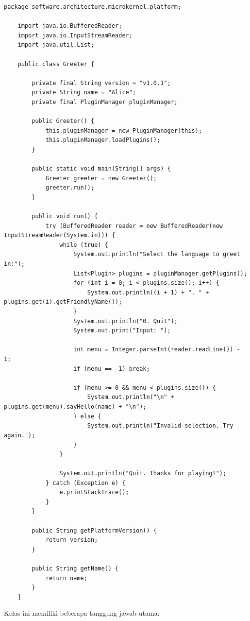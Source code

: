 \begin{lstlisting}[style=JavaStyle, caption={Kelas \texttt{Greeter}}, label={lst:greeter}, inputencoding=utf8]
	package software.architecture.microkernel.platform;
	
	import java.io.BufferedReader;
	import java.io.InputStreamReader;
	import java.util.List;
	
	public class Greeter {
		
		private final String version = "v1.0.1";
		private String name = "Alice";
		private final PluginManager pluginManager;
		
		public Greeter() {
			this.pluginManager = new PluginManager(this);
			this.pluginManager.loadPlugins();
		}
		
		public static void main(String[] args) {
			Greeter greeter = new Greeter();
			greeter.run();
		}
		
		public void run() {
			try (BufferedReader reader = new BufferedReader(new InputStreamReader(System.in))) {
				while (true) {
					System.out.println("Select the language to greet in:");
					List<Plugin> plugins = pluginManager.getPlugins();
					for (int i = 0; i < plugins.size(); i++) {
						System.out.println((i + 1) + ". " + plugins.get(i).getFriendlyName());
					}
					System.out.println("0. Quit");
					System.out.print("Input: ");
					
					int menu = Integer.parseInt(reader.readLine()) - 1;
					if (menu == -1) break;
					
					if (menu >= 0 && menu < plugins.size()) {
						System.out.println("\n" + plugins.get(menu).sayHello(name) + "\n");
					} else {
						System.out.println("Invalid selection. Try again.");
					}
				}
				
				System.out.println("Quit. Thanks for playing!");
			} catch (Exception e) {
				e.printStackTrace();
			}
		}
		
		public String getPlatformVersion() {
			return version;
		}
		
		public String getName() {
			return name;
		}
	}
\end{lstlisting}

Kelas ini memiliki beberapa tanggung jawab utama:

